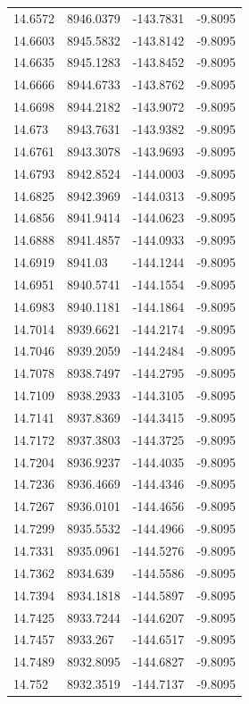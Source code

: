 \begin{table}[H]
\begin{tabular}{llll}
14.6572 & 8946.0379 & -143.7831 & -9.8095 \\
14.6603 & 8945.5832 & -143.8142 & -9.8095 \\
14.6635 & 8945.1283 & -143.8452 & -9.8095 \\
14.6666 & 8944.6733 & -143.8762 & -9.8095 \\
14.6698 & 8944.2182 & -143.9072 & -9.8095 \\
14.673 & 8943.7631 & -143.9382 & -9.8095 \\
14.6761 & 8943.3078 & -143.9693 & -9.8095 \\
14.6793 & 8942.8524 & -144.0003 & -9.8095 \\
14.6825 & 8942.3969 & -144.0313 & -9.8095 \\
14.6856 & 8941.9414 & -144.0623 & -9.8095 \\
14.6888 & 8941.4857 & -144.0933 & -9.8095 \\
14.6919 & 8941.03 & -144.1244 & -9.8095 \\
14.6951 & 8940.5741 & -144.1554 & -9.8095 \\
14.6983 & 8940.1181 & -144.1864 & -9.8095 \\
14.7014 & 8939.6621 & -144.2174 & -9.8095 \\
14.7046 & 8939.2059 & -144.2484 & -9.8095 \\
14.7078 & 8938.7497 & -144.2795 & -9.8095 \\
14.7109 & 8938.2933 & -144.3105 & -9.8095 \\
14.7141 & 8937.8369 & -144.3415 & -9.8095 \\
14.7172 & 8937.3803 & -144.3725 & -9.8095 \\
14.7204 & 8936.9237 & -144.4035 & -9.8095 \\
14.7236 & 8936.4669 & -144.4346 & -9.8095 \\
14.7267 & 8936.0101 & -144.4656 & -9.8095 \\
14.7299 & 8935.5532 & -144.4966 & -9.8095 \\
14.7331 & 8935.0961 & -144.5276 & -9.8095 \\
14.7362 & 8934.639 & -144.5586 & -9.8095 \\
14.7394 & 8934.1818 & -144.5897 & -9.8095 \\
14.7425 & 8933.7244 & -144.6207 & -9.8095 \\
14.7457 & 8933.267 & -144.6517 & -9.8095 \\
14.7489 & 8932.8095 & -144.6827 & -9.8095 \\
14.752 & 8932.3519 & -144.7137 & -9.8095 \\

\end{tabular}
\end{table}
